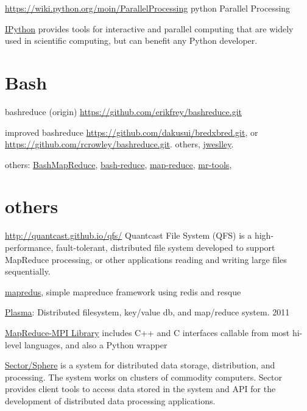 \documentclass[letter,11pt,onecolumn]{book}
\begin{document}
\url{https://wiki.python.org/moin/ParallelProcessing}
python Parallel Processing

\href{http://ipython.org/}{IPython} provides tools for interactive and parallel computing that are widely used in scientific computing, but can benefit any Python developer.

\section{Bash}

bashreduce (origin) \url{https://github.com/erikfrey/bashreduce.git}

improved bashreduce \url{https://github.com/dakusui/bredxbred.git},
or \url{https://github.com/rcrowley/bashreduce.git}. others, \href{https://github.com/jweslley/bashreduce.git}{jweslley}.



others:
\href{https://github.com/jasonMatney/BashMapReduce.git}{BashMapReduce},
\href{https://github.com/sorhus/bash-reduce.git}{bash-reduce},
\href{https://github.com/colestanfield/map-reduce.git}{map-reduce},
\href{https://github.com/argent0/mr-tools.git}{mr-tools},


\section{others}



\url{http://quantcast.github.io/qfs/}
Quantcast File System (QFS) is a high-performance, fault-tolerant, distributed file system developed to support MapReduce processing, or other applications reading and writing large files sequentially.

\href{https://rubygems.org/gems/mapredus}{mapredus}, simple mapreduce framework using redis and resque

\href{http://projects.camlcity.org/projects/plasma.html}{Plasma}: Distributed filesystem, key/value db, and map/reduce system. 2011


\href{http://mapreduce.sandia.gov/}{MapReduce-MPI Library} includes C++ and C interfaces callable from most hi-level languages, and also a Python wrapper


\href{http://sector.sourceforge.net/}{Sector/Sphere} is a system for distributed data storage, distribution, and processing. The system works on clusters of commodity computers. Sector provides client tools to access data stored in the system and API for the development of distributed data processing applications.
\end{document}
